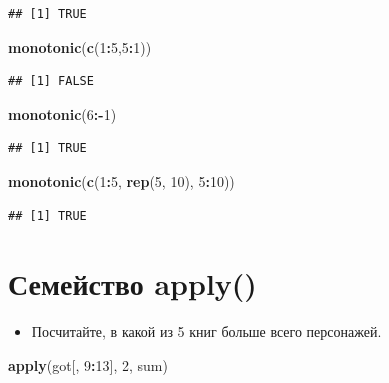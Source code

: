\documentclass[]{book}
\newenvironment{Shaded}{\begin{snugshade}}{\end{snugshade}}
\newcommand{\KeywordTok}[1]{\textcolor[rgb]{0.13,0.29,0.53}{\textbf{#1}}}
\newcommand{\DecValTok}[1]{\textcolor[rgb]{0.00,0.00,0.81}{#1}}
\newcommand{\OperatorTok}[1]{\textcolor[rgb]{0.81,0.36,0.00}{\textbf{#1}}}
\newcommand{\NormalTok}[1]{#1}
\providecommand{\tightlist}{%
  \setlength{\itemsep}{0pt}\setlength{\parskip}{0pt}}
\begin{document}
\begin{verbatim}
## [1] TRUE
\end{verbatim}

\begin{Shaded}
\begin{Highlighting}[]
\KeywordTok{monotonic}\NormalTok{(}\KeywordTok{c}\NormalTok{(}\DecValTok{1}\OperatorTok{:}\DecValTok{5}\NormalTok{,}\DecValTok{5}\OperatorTok{:}\DecValTok{1}\NormalTok{))}
\end{Highlighting}
\end{Shaded}

\begin{verbatim}
## [1] FALSE
\end{verbatim}

\begin{Shaded}
\begin{Highlighting}[]
\KeywordTok{monotonic}\NormalTok{(}\DecValTok{6}\OperatorTok{:-}\DecValTok{1}\NormalTok{)}
\end{Highlighting}
\end{Shaded}

\begin{verbatim}
## [1] TRUE
\end{verbatim}

\begin{Shaded}
\begin{Highlighting}[]
\KeywordTok{monotonic}\NormalTok{(}\KeywordTok{c}\NormalTok{(}\DecValTok{1}\OperatorTok{:}\DecValTok{5}\NormalTok{, }\KeywordTok{rep}\NormalTok{(}\DecValTok{5}\NormalTok{, }\DecValTok{10}\NormalTok{), }\DecValTok{5}\OperatorTok{:}\DecValTok{10}\NormalTok{))}
\end{Highlighting}
\end{Shaded}

\begin{verbatim}
## [1] TRUE
\end{verbatim}

\section{Семейство apply()}\label{solvtask_text}

\begin{itemize}
\tightlist
\item
  Посчитайте, в какой из 5 книг больше всего персонажей.
\end{itemize}

\begin{Shaded}
\begin{Highlighting}[]
\KeywordTok{apply}\NormalTok{(got[, }\DecValTok{9}\OperatorTok{:}\DecValTok{13}\NormalTok{], }\DecValTok{2}\NormalTok{, sum)}
\end{Highlighting}
\end{Shaded}
\end{document}
